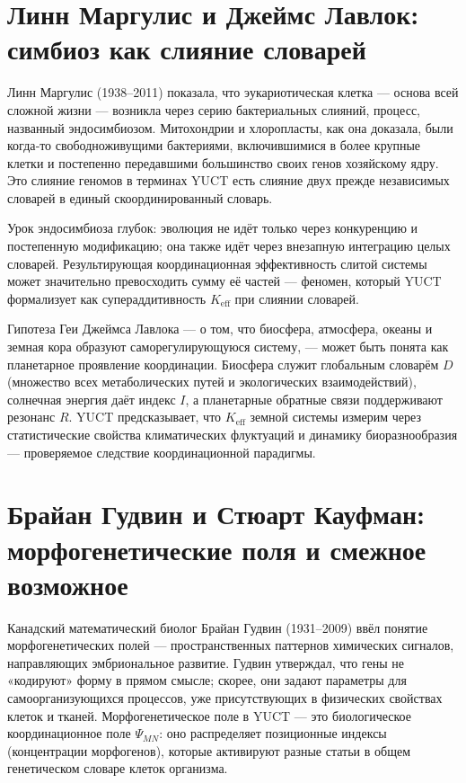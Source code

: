 \documentclass[12pt,a4paper]{article}
\begin{document}
	\section{Линн Маргулис и Джеймс Лавлок: симбиоз как слияние словарей}
	
	Линн Маргулис (1938–2011) показала, что эукариотическая клетка — основа всей сложной жизни — возникла через серию бактериальных слияний, процесс, названный эндосимбиозом. Митохондрии и хлоропласты, как она доказала, были когда‑то свободноживущими бактериями, включившимися в более крупные клетки и постепенно передавшими большинство своих генов хозяйскому ядру. Это слияние геномов в терминах YUCT есть слияние двух прежде независимых словарей в единый скоординированный словарь.
	
	Урок эндосимбиоза глубок: эволюция не идёт только через конкуренцию и постепенную модификацию; она также идёт через внезапную интеграцию целых словарей. Результирующая координационная эффективность слитой системы может значительно превосходить сумму её частей — феномен, который YUCT формализует как супераддитивность \(K_{\mathrm{eff}}\) при слиянии словарей.
	
	Гипотеза Геи Джеймса Лавлока — о том, что биосфера, атмосфера, океаны и земная кора образуют саморегулирующуюся систему, — может быть понята как планетарное проявление координации. Биосфера служит глобальным словарём \(D\) (множество всех метаболических путей и экологических взаимодействий), солнечная энергия даёт индекс \(I\), а планетарные обратные связи поддерживают резонанс \(R\). YUCT предсказывает, что \(K_{\mathrm{eff}}\) земной системы измерим через статистические свойства климатических флуктуаций и динамику биоразнообразия — проверяемое следствие координационной парадигмы.
	
	\section{Брайан Гудвин и Стюарт Кауфман: морфогенетические поля и смежное возможное}
	
	Канадский математический биолог Брайан Гудвин (1931–2009) ввёл понятие морфогенетических полей — пространственных паттернов химических сигналов, направляющих эмбриональное развитие. Гудвин утверждал, что гены не «кодируют» форму в прямом смысле; скорее, они задают параметры для самоорганизующихся процессов, уже присутствующих в физических свойствах клеток и тканей. Морфогенетическое поле в YUCT — это биологическое координационное поле \(\Psi_{MN}\): оно распределяет позиционные индексы (концентрации морфогенов), которые активируют разные статьи в общем генетическом словаре клеток организма.
	
\end{document}
